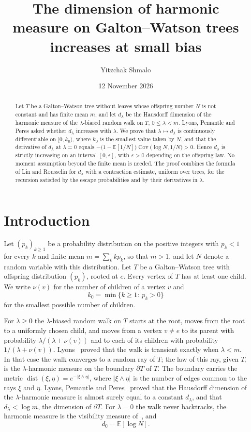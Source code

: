 \documentclass[11pt]{amsart}
\title[Harmonic measure on Galton--Watson trees at small bias]{The dimension of harmonic measure on
Galton--Watson trees increases at small bias}
\author{Yitzchak Shmalo}
\date{12 November 2026}
\theoremstyle{definition}
\newcommand{\E}{\mathbb{E}}
\newcommand{\eps}{\varepsilon}
\newcommand{\Cov}{\operatorname{Cov}}
\begin{document}
\begin{abstract}
Let $T$ be a Galton--Watson tree without leaves whose offspring number $N$ is not constant and has finite mean
$m$, and let $d_\lambda$ be the Hausdorff dimension of the harmonic measure of the $\lambda$-biased random walk
on $T$, $0\le\lambda<m$. Lyons, Pemantle and Peres asked whether $d_\lambda$ increases with $\lambda$. We prove
that $\lambda\mapsto d_\lambda$ is continuously differentiable on $[0,k_0)$, where $k_0$ is the smallest value
taken by $N$, and that the derivative of $d_\lambda$ at $\lambda=0$ equals
$-\bigl(1-\E[1/N]\bigr)\Cov\bigl(\log N,1/N\bigr)>0$. Hence $d_\lambda$ is strictly increasing on an interval $[0,\eps]$, with $\eps>0$ depending on the offspring
law. No moment assumption beyond the finite mean is needed. The proof combines the formula of Lin and Rousselin
for $d_\lambda$ with a contraction estimate, uniform over trees, for the recursion satisfied by the escape
probabilities and by their derivatives in $\lambda$.
\end{abstract}
\maketitle

\section{Introduction}\label{sec:intro}

Let $(p_k)_{k\ge1}$ be a probability distribution on the positive integers with $p_k<1$ for every $k$ and finite
mean $m=\sum_k kp_k$, so that $m>1$, and let $N$ denote a random variable with this distribution. Let $T$ be a
Galton--Watson tree with offspring distribution $(p_k)$, rooted at $e$. Every vertex of $T$ has at least one
child. We write $\nu(v)$ for the number of children of a vertex $v$ and
\[
   k_0=\min\{k\ge1:\ p_k>0\}
\]
for the smallest possible number of children.

For $\lambda\ge0$ the $\lambda$-biased random walk on $T$ starts at the root, moves from the root to a uniformly
chosen child, and moves from a vertex $v\ne e$ to its parent with probability $\lambda/(\lambda+\nu(v))$ and to
each of its children with probability $1/(\lambda+\nu(v))$. Lyons~\cite{Lyons90} proved that the walk is
transient exactly when $\lambda<m$. In that case the walk converges to a random ray of $T$; the law of this ray,
given $T$, is the $\lambda$-harmonic measure on the boundary $\partial T$ of $T$. The boundary carries the metric
$\operatorname{dist}(\xi,\eta)=e^{-|\xi\wedge\eta|}$, where $|\xi\wedge\eta|$ is the number of edges common to the rays $\xi$ and
$\eta$. Lyons, Pemantle and Peres~\cite{LPP95,LPP96} proved that the Hausdorff dimension of the
$\lambda$-harmonic measure is almost surely equal to a constant $d_\lambda$, and that $d_\lambda<\log m$, the
dimension of $\partial T$. For $\lambda=0$ the walk never backtracks, the harmonic measure is the visibility
measure of~\cite{LPP95}, and
\[
   d_0=\E[\log N].
\]
\end{document}
